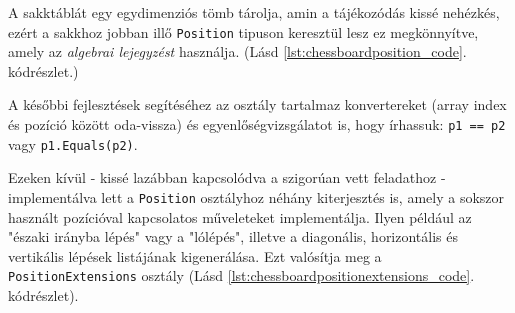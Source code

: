 \documentclass[twoside, a4paper, 12pt]{book}
\begin{document}
A sakktáblát egy egydimenziós tömb tárolja, amin a tájékozódás kissé nehézkés, ezért a sakkhoz jobban illő \texttt{Position} tipuson keresztül lesz ez megkönnyítve, amely az \textit{algebrai lejegyzést} használja. (Lásd \ref{lst:chessboardposition_code}. kódrészlet.)

A későbbi fejlesztések segítéséhez az osztály tartalmaz konvertereket (array index és pozíció között oda-vissza) és egyenlőségvizsgálatot is, hogy írhassuk: \texttt{p1 == p2} vagy \texttt{p1.Equals(p2)}.

Ezeken kívül - kissé lazábban kapcsolódva a szigorúan vett feladathoz - implementálva lett a \texttt{Position} osztályhoz néhány kiterjesztés is, amely a sokszor használt pozícióval kapcsolatos műveleteket implementálja. Ilyen például az "északi irányba lépés" vagy a "lólépés", illetve a diagonális, horizontális és vertikális lépések listájának kigenerálása. Ezt valósítja meg a \texttt{PositionExtensions} osztály (Lásd \ref{lst:chessboardpositionextensions_code}. kódrészlet).
\end{document}

